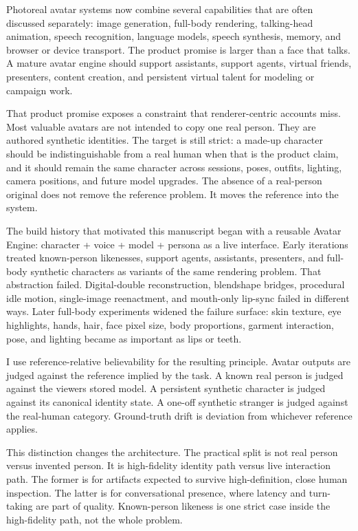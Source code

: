 \documentclass[
]{article}
\begin{document}
Photoreal avatar systems now combine several capabilities that are often
discussed separately: image generation, full-body rendering,
talking-head animation, speech recognition, language models, speech
synthesis, memory, and browser or device transport. The product promise
is larger than a face that talks. A mature avatar engine should support
assistants, support agents, virtual friends, presenters, content
creation, and persistent virtual talent for modeling or campaign work.

That product promise exposes a constraint that renderer-centric accounts
miss. Most valuable avatars are not intended to copy one real person.
They are authored synthetic identities. The target is still strict: a
made-up character should be indistinguishable from a real human when
that is the product claim, and it should remain the same character
across sessions, poses, outfits, lighting, camera positions, and future
model upgrades. The absence of a real-person original does not remove
the reference problem. It moves the reference into the system.

The build history that motivated this manuscript began with a reusable
Avatar Engine: character + voice + model + persona as a live interface.
Early iterations treated known-person likenesses, support agents,
assistants, presenters, and full-body synthetic characters as variants
of the same rendering problem. That abstraction failed. Digital-double
reconstruction, blendshape bridges, procedural idle motion, single-image
reenactment, and mouth-only lip-sync failed in different ways. Later
full-body experiments widened the failure surface: skin texture, eye
highlights, hands, hair, face pixel size, body proportions, garment
interaction, pose, and lighting became as important as lips or teeth.

I use reference-relative believability for the resulting principle.
Avatar outputs are judged against the reference implied by the task. A
known real person is judged against the viewer\textquotesingle s stored
model. A persistent synthetic character is judged against its canonical
identity state. A one-off synthetic stranger is judged against the
real-human category. Ground-truth drift is deviation from whichever
reference applies.

This distinction changes the architecture. The practical split is not
real person versus invented person. It is high-fidelity identity path
versus live interaction path. The former is for artifacts expected to
survive high-definition, close human inspection. The latter is for
conversational presence, where latency and turn-taking are part of
quality. Known-person likeness is one strict case inside the
high-fidelity path, not the whole problem.
\end{document}
